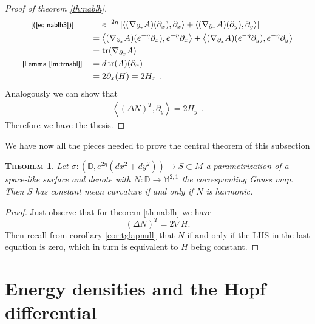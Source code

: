 \documentclass[a4paper,11pt,openright,twoside]{book}
\newcommand{\M}{\mathbb{M}^{2,1}}
\newcommand{\tr}{\operatorname{tr}}
\newcommand{\1}{\mathds{1}}
\newcommand{\commb}[1]{\textsf{{\footnotesize[#1]}}}
\newcommand{\qref}[1]{(\ref{#1})}
\theoremstyle{plain}
\newtheorem{thm}{\textsc{Theorem}}[chapter]
\theoremstyle{definition}
\theoremstyle{remark}
\begin{document}
\begin{proof}[Proof of theorem \ref{th:nablh}]
\begin{align*}
		\commb{\qref{eq:nablh3}}\qquad
		&= e^{-2\eta} \left[ \left< (\nabla_{\partial_x}A) (\partial_x) ,\partial_x \right> + \left< (\nabla_{\partial_x}A) (\partial_y) , \partial_y \right> \right]  \\
		&= \left< (\nabla_{\partial_x}A) (e^{-\eta }\partial_x) , e^{-\eta} \partial_x \right> +
		\left< (\nabla_{\partial_x}A) (e^{-\eta} \partial_y) , e^{-\eta}\partial_y \right>\\
		&= \tr ( \nabla_{\partial_x}A )  \\
		\commb{Lemma \ref{lm:trnabl}}\quad &= d\tr ( A ) (\partial_x)  \\
		&= 2 \partial_x(H) = 2H_x
	\ .	
	\end{align*}
	Analogously we can show that 
	\begin{align*}
		\left< (\Delta N) ^T, \partial_y\right> = 2 H_y	
	\ \ . 
	\end{align*}
	Therefore we have the thesis.
\end{proof}
We have now all the pieces needed to prove the central theorem of this subsection
\begin{thm}\label{th:gaussmapharmiffconsth}
	Let $\sigma:(\mathbb{D},e^{2\eta}(dx^2+dy^2)) \to  S \subset  M$ a parametrization of a space-like surface and denote with  $N:\mathbb{D}\to \M$ the corresponding Gauss map. Then $S$ has constant mean curvature if and only if $N$ is harmonic.
\end{thm}
\begin{proof}
	Just observe that for theorem  \ref{th:nablh} we have 
	\[(\Delta N)^T = 2 \nabla H. \]
	Then recall from corollary \ref{cor:tglapnull} that $N$ if and only if the LHS in the last equation is zero, which in turn is equivalent to $H$ being constant. 
\end{proof}
\section{Energy densities and the Hopf differential}
\end{document}
